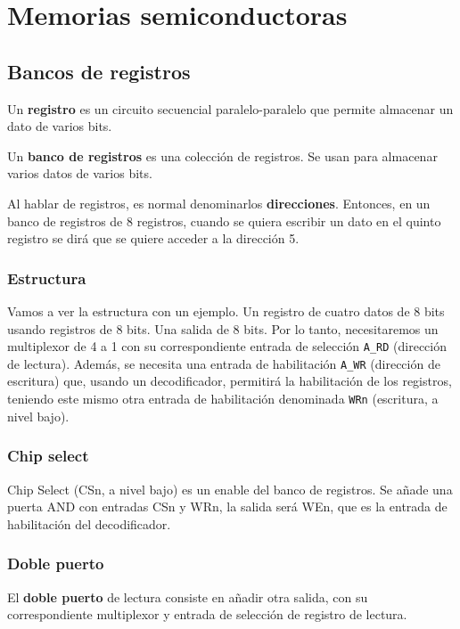 \documentclass[a4paper]{book}
\begin{document}
\chapter{Memorias semiconductoras}
\section{Bancos de registros}
Un \textbf{registro} es un circuito secuencial paralelo-paralelo que permite almacenar un dato de varios bits.

Un \textbf{banco de registros} es una colección de registros. Se usan para almacenar varios datos de varios bits.

Al hablar de registros, es normal denominarlos \textbf{direcciones}. Entonces, en un banco de registros de 8 registros, cuando se quiera escribir un dato en el quinto registro se dirá que se quiere acceder a la dirección 5.

\subsection{Estructura}

Vamos a ver la estructura con un ejemplo. Un registro de cuatro datos de 8 bits usando registros de 8 bits. Una salida de 8 bits. Por lo tanto, necesitaremos un multiplexor de 4 a 1 con su correspondiente entrada de selección \verb|A_RD| (dirección de lectura). Además, se necesita una entrada de habilitación \verb|A_WR| (dirección de escritura) que, usando un decodificador, permitirá la habilitación de los registros, teniendo este mismo otra entrada de habilitación denominada \verb|WRn| (escritura, a nivel bajo).

\subsection{Chip select}

Chip Select (CSn, a nivel bajo) es un enable del banco de registros. Se añade una puerta AND con entradas CSn y WRn, la salida será WEn, que es la entrada de habilitación del decodificador.

\subsection{Doble puerto}

El \textbf{doble puerto} de lectura consiste en añadir otra salida, con su correspondiente multiplexor y entrada de selección de registro de lectura.
\end{document}
